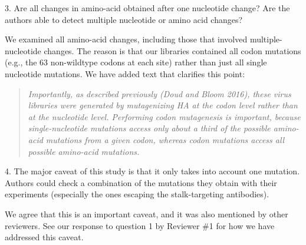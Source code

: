 \documentclass[11pt, oneside]{article}   	%
\begin{document}
3. Are all changes in amino-acid obtained after one nucleotide change? Are the authors able to detect multiple nucleotide or amino acid changes?

{\color{black}
We examined all amino-acid changes, including those that involved multiple-nucleotide changes.
The reason is that our libraries contained all codon mutations (e.g., the 63 non-wildtype codons at each site) rather than just all single nucleotide mutations.
We have added text that clarifies this point:
\begin{quote}
\textsl{Importantly, as described previously (Doud and Bloom 2016), these virus libraries were generated by mutagenizing HA at the \emph{codon} level rather than at the nucleotide level.
Performing codon mutagenesis is important, because single-nucleotide mutations access only about a third of the possible amino-acid mutations from a given codon, whereas codon mutations access all possible amino-acid mutations.}
\end{quote}
}

4. The major caveat of this study is that it only takes into account one mutation. Authors could check a combination of the mutations they obtain with their experiments (especially the ones escaping the stalk-targeting antibodies).

{\color{black}
We agree that this is an important caveat, and it was also mentioned by other reviewers.
See our response to question 1 by Reviewer \#1 for how we have addressed this caveat.}
\end{document}
